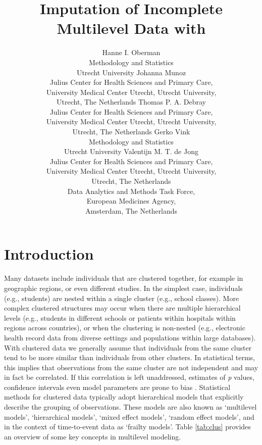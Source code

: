 \documentclass[
]{jss}
\author{
Hanne I. Oberman\\Methodology and Statistics\\
Utrecht University \And Johanna Munoz\\Julius Center for Health Sciences
and Primary Care,\\
University Medical Center Utrecht, Utrecht University,\\
Utrecht, The Netherlands \AND Thomas P. A. Debray\\Julius Center
for Health Sciences and Primary Care,\\
University Medical Center Utrecht, Utrecht University,\\
Utrecht, The Netherlands \And Gerko Vink\\Methodology and Statistics\\
Utrecht University \AND Valentijn M. T. de Jong\\Julius Center for
Health Sciences and Primary Care,\\
University Medical Center Utrecht, Utrecht University,\\
Utrecht, The Netherlands\\
Data Analytics and Methods Task Force,\\
European Medicines Agency,\\
Amsterdam, The Netherlands
}
\title{Imputation of Incomplete Multilevel Data with \pkg{mice}}
\begin{document}
\newpage

\hypertarget{introduction}{%
\section{Introduction}\label{introduction}}

Many datasets include individuals that are clustered together, for
example in geographic regions, or even different studies. In the
simplest case, individuals (e.g., students) are nested within a single
cluster (e.g., school classes). More complex clustered structures may
occur when there are multiple hierarchical levels (e.g., students in
different schools or patients within hospitals within regions across
countries), or when the clustering is non-nested (e.g., electronic
health record data from diverse settings and populations within large
databases). With clustered data we generally assume that individuals
from the same cluster tend to be more similar than individuals from
other clusters. In statistical terms, this implies that observations
from the same cluster are not independent and may in fact be correlated.
If this correlation is left unaddressed, estimates of \emph{p} values,
confidence intervals even model parameters are prone to bias
\citep{loca01}. Statistical methods for clustered data typically adopt
hierarchical models that explicitly describe the grouping of
observations. These models are also known as `multilevel models',
`hierarchical models', `mixed effect models', `random effect models',
and in the context of time-to-event data as `frailty models'. Table
\ref{tab:clus} provides an overview of some key concepts in multilevel
modeling.
\end{document}
